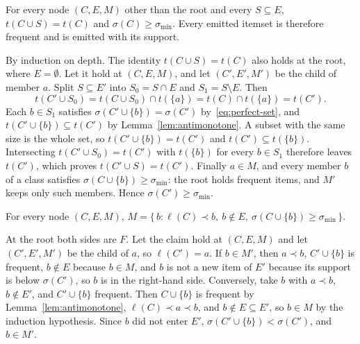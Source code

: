 \begin{lemma}
\label{lem:perfect-exact}
For every node $(C, E, M)$ other than the root and every $S \subseteq E$,
$t(C \cup S) = t(C)$ and $\sigma(C) \ge \sigma_{\min}$. Every emitted itemset is
therefore frequent and is emitted with its support.
\end{lemma}
\begin{IEEEproof}
By induction on depth. The identity $t(C \cup S) = t(C)$ also holds at the root,
where $E = \emptyset$. Let it hold at $(C, E, M)$, and let $(C', E', M')$ be the child of member
$a$. Split $S \subseteq E'$ into $S_0 = S \cap E$ and $S_1 = S \setminus E$. Then
\begin{equation*}
  t(C' \cup S_0) = t(C \cup S_0) \cap t(\{a\}) = t(C) \cap t(\{a\}) = t(C').
\end{equation*}
Each $b \in S_1$ satisfies $\sigma(C' \cup \{b\}) = \sigma(C')$ by~\eqref{eq:perfect-set},
and $t(C' \cup \{b\}) \subseteq t(C')$ by Lemma~\ref{lem:antimonotone}. A subset with the
same size is the whole set, so $t(C' \cup \{b\}) = t(C')$ and $t(C') \subseteq t(\{b\})$.
Intersecting $t(C' \cup S_0) = t(C')$ with $t(\{b\})$ for every $b \in S_1$ therefore
leaves $t(C')$, which proves $t(C' \cup S) = t(C')$. Finally $a \in M$, and every member
$b$ of a class satisfies $\sigma(C \cup \{b\}) \ge \sigma_{\min}$: the root holds frequent
items, and $M'$ keeps only such members. Hence $\sigma(C') \ge \sigma_{\min}$.
\end{IEEEproof}

\begin{lemma}
\label{lem:perfect-members}
For every node $(C, E, M)$,
$M = \{\, b : \ell(C) \prec b,\ b \notin E,\ \sigma(C \cup \{b\}) \ge \sigma_{\min} \,\}$.
\end{lemma}
\begin{IEEEproof}
At the root both sides are $F$. Let the claim hold at $(C, E, M)$ and let
$(C', E', M')$ be the child of $a$, so $\ell(C') = a$. If $b \in M'$, then $a \prec b$,
$C' \cup \{b\}$ is frequent, $b \notin E$ because $b \in M$, and $b$ is not a new item of
$E'$ because its support is below $\sigma(C')$, so $b$ is in the right-hand side.
Conversely, take $b$ with $a \prec b$, $b \notin E'$, and $C' \cup \{b\}$ frequent. Then
$C \cup \{b\}$ is frequent by Lemma~\ref{lem:antimonotone}, $\ell(C) \prec a \prec b$,
and $b \notin E \subseteq E'$, so $b \in M$ by the induction hypothesis. Since $b$ did
not enter $E'$, $\sigma(C' \cup \{b\}) < \sigma(C')$, and $b \in M'$.
\end{IEEEproof}

